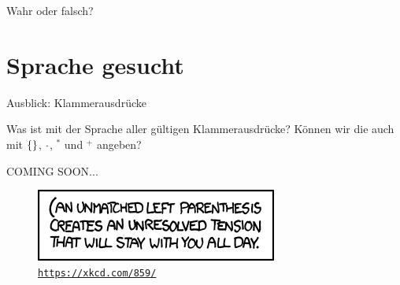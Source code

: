 \begin{frame}[t]{Wahr oder falsch?}
\end{frame}






\section{Sprache gesucht}





\begin{frame}{Ausblick: Klammerausdrücke}
	
	Was ist mit der Sprache aller gültigen Klammerausdrücke? Können wir die auch mit $\left\{\right\}$, $\cdot$, ${}^*$ und ${}^+$ angeben? \\[1em]
	\pause
	
	\begin{block}{}
		\Large
		\centering
		COMING SOON... \\[1em]
	\end{block}

	\begin{figure}[H]
		\centering
		\includegraphics[scale=0.7]{xkcd/(.png}
		\vspace{-7pt}
		\caption{ \texttt{\url{https://xkcd.com/859/}} }
	\end{figure}
\end{frame}

%

